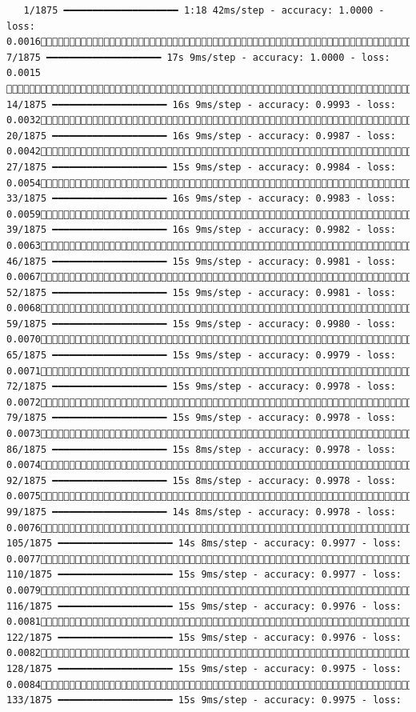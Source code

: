 \documentclass[
  letterpaper,
  DIV=11,
  numbers=noendperiod]{scrreprt}
\begin{document}
\begin{verbatim}
   1/1875 ━━━━━━━━━━━━━━━━━━━━ 1:18 42ms/step - accuracy: 1.0000 - loss: 0.0016   7/1875 ━━━━━━━━━━━━━━━━━━━━ 17s 9ms/step - accuracy: 1.0000 - loss: 0.0015    14/1875 ━━━━━━━━━━━━━━━━━━━━ 16s 9ms/step - accuracy: 0.9993 - loss: 0.0032  20/1875 ━━━━━━━━━━━━━━━━━━━━ 16s 9ms/step - accuracy: 0.9987 - loss: 0.0042  27/1875 ━━━━━━━━━━━━━━━━━━━━ 15s 9ms/step - accuracy: 0.9984 - loss: 0.0054  33/1875 ━━━━━━━━━━━━━━━━━━━━ 16s 9ms/step - accuracy: 0.9983 - loss: 0.0059  39/1875 ━━━━━━━━━━━━━━━━━━━━ 16s 9ms/step - accuracy: 0.9982 - loss: 0.0063  46/1875 ━━━━━━━━━━━━━━━━━━━━ 15s 9ms/step - accuracy: 0.9981 - loss: 0.0067  52/1875 ━━━━━━━━━━━━━━━━━━━━ 15s 9ms/step - accuracy: 0.9981 - loss: 0.0068  59/1875 ━━━━━━━━━━━━━━━━━━━━ 15s 9ms/step - accuracy: 0.9980 - loss: 0.0070  65/1875 ━━━━━━━━━━━━━━━━━━━━ 15s 9ms/step - accuracy: 0.9979 - loss: 0.0071  72/1875 ━━━━━━━━━━━━━━━━━━━━ 15s 9ms/step - accuracy: 0.9978 - loss: 0.0072  79/1875 ━━━━━━━━━━━━━━━━━━━━ 15s 9ms/step - accuracy: 0.9978 - loss: 0.0073  86/1875 ━━━━━━━━━━━━━━━━━━━━ 15s 8ms/step - accuracy: 0.9978 - loss: 0.0074  92/1875 ━━━━━━━━━━━━━━━━━━━━ 15s 8ms/step - accuracy: 0.9978 - loss: 0.0075  99/1875 ━━━━━━━━━━━━━━━━━━━━ 14s 8ms/step - accuracy: 0.9978 - loss: 0.0076 105/1875 ━━━━━━━━━━━━━━━━━━━━ 14s 8ms/step - accuracy: 0.9977 - loss: 0.0077 110/1875 ━━━━━━━━━━━━━━━━━━━━ 15s 9ms/step - accuracy: 0.9977 - loss: 0.0079 116/1875 ━━━━━━━━━━━━━━━━━━━━ 15s 9ms/step - accuracy: 0.9976 - loss: 0.0081 122/1875 ━━━━━━━━━━━━━━━━━━━━ 15s 9ms/step - accuracy: 0.9976 - loss: 0.0082 128/1875 ━━━━━━━━━━━━━━━━━━━━ 15s 9ms/step - accuracy: 0.9975 - loss: 0.0084 133/1875 ━━━━━━━━━━━━━━━━━━━━ 15s 9ms/step - accuracy: 0.9975 - loss: 
\end{verbatim}
\end{document}
